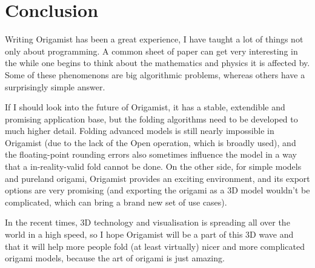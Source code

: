 \chapter*{Conclusion}

Writing Origamist has been a great experience, I have taught a lot of things not only about programming. A common sheet of paper can get very interesting in the while one begins to think about the mathematics and physics it is affected by. Some of these phenomenons are big algorithmic problems, whereas others have a surprisingly simple answer. 

If I should look into the future of Origamist, it has a stable, extendible and promising application base, but the folding algorithms need to be developed to much higher detail. Folding advanced models is still nearly impossible in Origamist (due to the lack of the Open operation, which is broadly used), and the floating-point rounding errors also sometimes influence the model in a way that a in-reality-valid fold cannot be done. On the other side, for simple models and pureland origami, Origamist provides an exciting environment, and its export options are very promising (and exporting the origami as a 3D model wouldn't be complicated, which can bring a brand new set of use cases).

In the recent times, 3D technology and visualisation is spreading all over the world in a high speed, so I hope Origamist will be a part of this 3D wave and that it will help more people fold (at least virtually) nicer and more complicated origami models, because the art of origami is just amazing.
